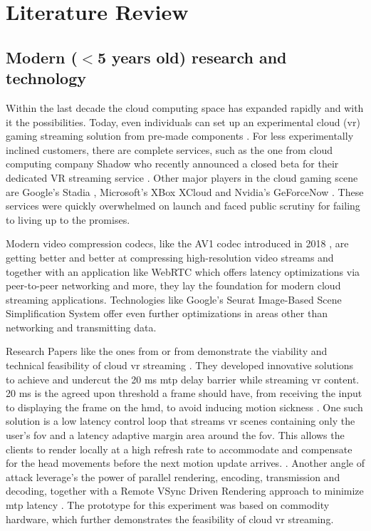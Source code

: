 \section{Literature Review}
\label{sec:lit}
\subsection{Modern ($<$5 years old) research and technology}

Within the last decade the cloud computing space has expanded rapidly and with it the possibilities. Today, even individuals can set up an experimental cloud (\acrfull{vr}) gaming streaming solution from pre-made components \parencite{tayoexe} \parencite{clouddesktopguide}. For less experimentally inclined customers, there are complete services, such as the one from cloud computing company Shadow \parencite{shadow} who recently announced a closed beta for their dedicated VR streaming service \parencite{shadowvr}. Other major players in the cloud gaming  scene are Google's Stadia \parencite{stadia}, Microsoft's XBox XCloud \parencite{xcloud} and Nvidia's GeForceNow \parencite{geforcenow}. These services were quickly overwhelmed on launch and faced public scrutiny for failing to living up to the promises. 

Modern video compression codecs, like the AV1 codec introduced in 2018 \parencite{av1}, are getting better and better at compressing high-resolution video streams and together with an application like WebRTC \parencite{webRTC} which offers latency optimizations via peer-to-peer networking and more, they lay the foundation for modern cloud streaming applications. Technologies like Google's Seurat Image\hyp{}Based Scene Simplification System \parencite{seurat} offer even further optimizations in areas other than networking and transmitting data. 

Research Papers like the ones from \cite{cutcord} or from \cite{mvr} demonstrate the viability and technical feasibility of cloud \acrshort{vr} streaming . They developed innovative solutions to achieve and undercut the 20 \acrfull{ms}  \acrfull{mtp} delay barrier while streaming \acrshort{vr} content. 20 \acrshort{ms} is the agreed upon threshold a frame should have, from receiving the input to displaying the frame on the \acrfull{hmd}, to avoid inducing motion sickness \parencite{valvevrlatency}. One such solution is a low latency control loop that streams \acrshort{vr} scenes containing only the user’s \acrfull{fov} and a latency adaptive margin area around the \acrshort{fov}. This allows the clients to render locally at a high refresh rate to accommodate and compensate for the head movements before the next motion update arrives. \parencite{mvr}. Another angle of attack  leverage's the power of parallel rendering, encoding, transmission and decoding, together with a Remote VSync Driven Rendering approach to minimize \acrshort{mtp} latency \parencite{cutcord}. The prototype for this experiment was based on commodity hardware, which further demonstrates the feasibility of cloud \acrshort{vr} streaming.

